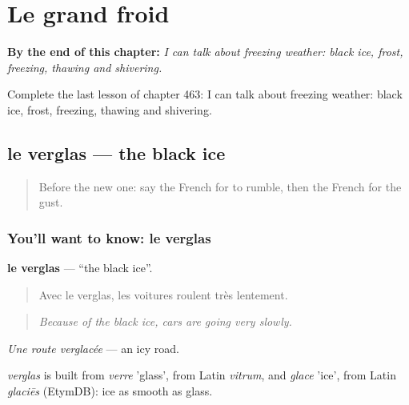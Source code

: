
\chapter{Le grand froid}
\label{ch:fr-le-grand-froid}

\begin{chapteropening}
\textbf{By the end of this chapter:} \emph{I can talk about freezing weather: black ice, frost, freezing, thawing and shivering.}

Complete the last lesson of chapter 463: I can talk about freezing weather: black ice, frost, freezing, thawing and shivering.
\end{chapteropening}

\section[le verglas]{le verglas — the black ice}

\label{lesson:FR-C463-verglas}



\begin{quote}
Before the new one: say the French for to rumble, then the French for the gust.
\end{quote}

\subsection*{You'll want to know: le verglas}
\textbf{le verglas} — \textquotedblleft{}the black ice\textquotedblright{}.

\begin{quote}
Avec le verglas, les voitures roulent très lentement.
\end{quote}

\begin{quote}
\emph{Because of the black ice, cars are going very slowly.}
\end{quote}

\emph{Une route verglacée} — an icy road.

\begin{cousinweb}
\emph{verglas} is built from \emph{verre} 'glass', from Latin \emph{vitrum}, and \emph{glace} 'ice', from Latin \emph{glaciēs} (EtymDB): ice as smooth as glass.
\end{cousinweb}

